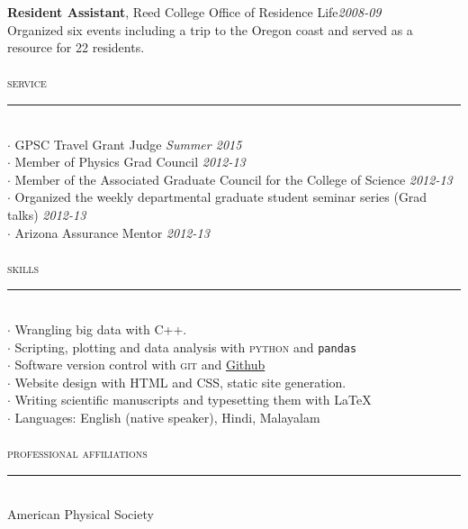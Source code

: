 \documentclass[10pt]{report}
\newcommand{\HRule}{\rule[2mm]{\linewidth}{0.1mm}}
\begin{document}
\normalsize\textsf{\textbf{Resident Assistant}}, \textsf{\normalsize Reed College Office of Residence Life}\hfill \textit{\small 2008-09}\\
\small Organized six events including a trip to the Oregon coast and  served as a resource for 22 residents.
\\\\
\large\textsc{service}\\
\HRule\\
\small $\cdot$ GPSC Travel Grant Judge \hfill\emph{Summer 2015}\\
\small $\cdot$ Member of Physics Grad Council \hfill\emph{2012-13}\\
$\cdot$ Member of the Associated Graduate Council for the College of Science \hfill\emph{2012-13}\\
$\cdot$ Organized the weekly departmental graduate student seminar series (Grad talks) \hfill\emph{2012-13}\\
$\cdot$ Arizona Assurance Mentor \hfill\emph{2012-13}
\\\\
\large\textsc{skills}\\
\HRule\\
\small $\cdot$ Wrangling big data with C++.\\ 
\small $\cdot$ Scripting, plotting and data analysis with \textsc{python} and \texttt{pandas}\\ 
\small $\cdot$ Software version control with \textsc{git} and \href{http://www.github.com/adarshp}{Github}\\
\small $\cdot$ Website design with \textsc{HTML} and \textsc{CSS}, static site generation.\\ 
\small $\cdot$ Writing scientific manuscripts and typesetting them with \LaTeX\\ 
\small $\cdot$ Languages: English (native speaker), Hindi, Malayalam
\\\\
\large\textsc{professional affiliations}\\
\HRule\\
\small American Physical Society
\end{document}
